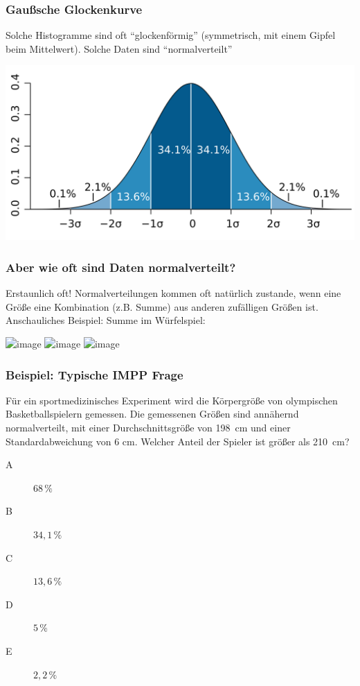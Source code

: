 \documentclass{beamer}
\begin{document}
\begin{frame}
\frametitle{Gaußsche Glockenkurve}

Solche Histogramme sind oft ``glockenförmig'' (symmetrisch, mit einem Gipfel beim Mittelwert). Solche Daten sind ``normalverteilt'' 


\begin{center}
\includegraphics[width=\textwidth]{empirical_rule.png}
\end{center}





\end{frame}

\begin{frame}
\frametitle{Aber wie oft sind Daten normalverteilt?}

Erstaunlich oft! Normalverteilungen kommen oft natürlich zustande, wenn eine Größe eine Kombination (z.B. Summe) aus anderen zufälligen Größen ist. Anschauliches Beispiel: Summe im Würfelspiel:

\begin{center}
\includegraphics<1>[width=0.8\textwidth]{onedie.png}
\includegraphics<2>[width=0.8\textwidth]{twodice.png}
\includegraphics<3>[width=0.8\textwidth]{fivedice.png}
\end{center}



\end{frame}

\begin{frame}
\frametitle{Beispiel: Typische IMPP Frage}

Für ein sportmedizinisches Experiment wird die Körpergröße von olympischen Basketballspielern  gemessen. Die gemessenen Größen sind annähernd normalverteilt, mit einer  Durchschnittsgröße von \SI{198}{\centi\meter}  und einer Standardabweichung von 6 cm. Welcher Anteil der Spieler ist größer als \SI{210}{\centi\meter}?


\begin{description}
\item[A] \(68\,\%\) 
\item[B] \(34,1\,\%\)
\item[C] \(13,6\,\%\)
\item[D] \(5\,\%\)
\item[E] \(2,2\,\%\)
\end{description}

\end{frame}
\end{document}
